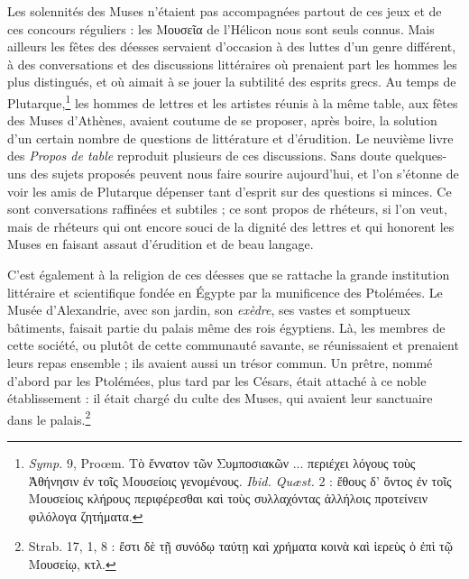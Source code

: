 \documentclass[a4paper, 11pt, oneside, polutonikogreek, french]{article}
\begin{document}
Les solennités des Muses n'étaient pas accompagnées partout de ces jeux et de ces concours réguliers : les Μουσεῖα de l'Hélicon nous sont seuls connus. Mais ailleurs les fêtes des déesses servaient d'occasion à des luttes d'un genre différent, à des conversations et des discussions littéraires où prenaient part les hommes les plus distingués, et où aimait à se jouer la subtilité des esprits grecs. Au temps de Plutarque,\footnote{\emph{Symp.} 9, Proœm. Τὸ ἔννατον τῶν Συμποσιακῶν ... περιέχει λόγους τοὺς Ἀθήνησιν ἐν τοῖς Μουσείοις γενομένους. \emph{Ibid. Quæst.} 2 : ἔθους δ' ὄντος ἐν τοῖς Μουσείοις κλήρους περιφέρεσθαι καὶ τοὺς συλλαχόντας ἀλλήλοις προτείνειν φιλόλογα ζητήματα.} les hommes de lettres et les artistes réunis à la même table, aux fêtes des Muses d'Athènes, avaient coutume de se proposer, après boire, la solution d'un certain nombre de questions de littérature et d'érudition. Le neuvième livre des \emph{Propos de table} reproduit plusieurs de ces discussions. Sans doute quelques-uns des sujets proposés peuvent nous faire sourire aujourd'hui, et l'on s'étonne de voir les amis de Plutarque dépenser tant d'esprit sur des questions si minces. Ce sont conversations raffinées et subtiles ; ce sont propos de rhéteurs, si l'on veut, mais de rhéteurs qui ont encore souci de la dignité des lettres et qui honorent les Muses en faisant assaut d'érudition et de beau langage.

C'est également à la religion de ces déesses que se rattache la grande institution littéraire et scientifique fondée en Égypte par la munificence des Ptolémées. Le Musée d'Alexandrie, avec son jardin, son \emph{exèdre}, ses vastes et somptueux bâtiments, faisait partie du palais même des rois égyptiens. Là, les membres de cette société, ou plutôt de cette communauté savante, se réunissaient et prenaient leurs repas ensemble ; ils avaient aussi un trésor commun. Un prêtre, nommé d'abord par les Ptolémées, plus tard par les Césars, était attaché à ce noble établissement : il était chargé du culte des Muses, qui avaient leur sanctuaire dans le palais.\footnote{Strab. 17, 1, 8 : ἔστι δὲ τῇ συνόδῳ ταύτῃ καὶ χρήματα κοινὰ καὶ ἱερεὺς ὁ ἐπὶ τῷ Μουσείῳ, κτλ.}
\end{document}
